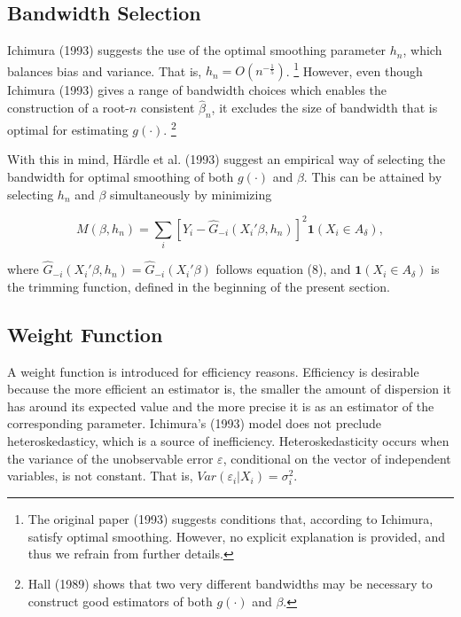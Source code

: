 \subsection{Bandwidth Selection} %
\label{sub:Bandwidth Selection}

Ichimura (1993) \cite{[6]} suggests the use of the optimal smoothing parameter $h_n$, which balances bias and variance. That is, $h_n = O(n^{-\frac{1}{5}})$. \footnote{The original paper (1993) \cite{[6]} suggests conditions that, according to Ichimura, satisfy optimal smoothing. However, no explicit explanation is provided, and thus we refrain from further details.} However, even though Ichimura (1993) \cite{[6]} gives a range of bandwidth choices which enables the construction of a root-$n$ consistent $\hat{\beta}_n$, it excludes the size of bandwidth that is optimal for estimating $g(\cdot)$. \footnote{Hall (1989) \cite{[17]} shows that two very different bandwidths may be necessary to construct good estimators of both $g(\cdot)$ and $\beta$.}
 
With this in mind, H{\"a}rdle et al. (1993) \cite{[18]} suggest an empirical way of selecting the bandwidth for optimal smoothing of both $g(\cdot)$ and $\beta$. This can be attained by selecting $h_n$ and $\beta$ simultaneously by minimizing

\begin{equation}
M(\beta, h_n) = \sum_i \left[ Y_i - \hat{G}_{-i}(X_i'\beta, h_n) \right]^2\mathbf{1}{(X_i \in A_\delta)},
\end{equation}

where $\hat{G}_{-i}(X_i'\beta, h_n) = \hat{G}_{-i}(X_i'\beta)$ follows equation (8), and $\mathbf{1}{(X_i \in A_\delta)}$ is the trimming function, defined in the beginning of the present section.

\subsection{Weight Function} %
\label{sub:Weight Function}

A weight function is introduced for efficiency reasons. Efficiency is desirable because the more efficient an estimator is, the smaller the amount of dispersion it has around its expected value and the more precise it is as an estimator of the corresponding parameter. Ichimura's (1993) \cite{[6]} model does not preclude heteroskedasticy, which is a source of inefficiency.  Heteroskedasticity occurs when the variance of the unobservable error $\varepsilon$, conditional on  the vector of independent variables, is not constant. That is, $Var(\varepsilon_i|X_i) = \sigma_i^2$.  

